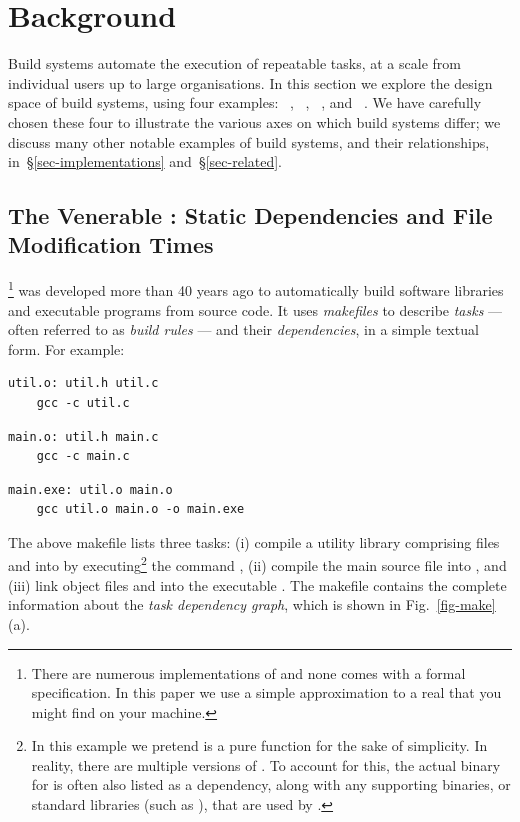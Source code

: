\section{Background}\label{sec-background}

Build systems automate the execution of repeatable tasks, at a scale from individual
users up to large organisations. In this section we explore the design space of build
systems, using four examples: \Make~\cite{feldman1979make},
\Shake~\cite{mitchell2012shake}, \mbox{\Bazel~\cite{bazel}}, and
\Excel~\cite{advanced_excel}.
We have carefully chosen these four to illustrate the various axes on which
build systems differ; we discuss many other notable examples of build systems,
and their relationships, in~\S\ref{sec-implementations} and~\S\ref{sec-related}.

\subsection{The Venerable \Make: Static Dependencies and File Modification Times}
\label{sec-background-make}

\Make\footnote{There are numerous implementations of \Make and none comes with a
formal specification. In this paper we use a simple approximation to a real
\Make that you might find on your machine.} was developed
more than 40 years ago to automatically build software libraries and executable
programs from source code. It uses \emph{makefiles} to describe \emph{tasks} --- often
referred to as \emph{build rules} --- and their \emph{dependencies}, in a simple textual
form. For example:

\vspace{1mm}
\begin{verbatim}
util.o: util.h util.c
    gcc -c util.c
\end{verbatim}
\begin{verbatim}
main.o: util.h main.c
    gcc -c main.c
\end{verbatim}
\begin{verbatim}
main.exe: util.o main.o
    gcc util.o main.o -o main.exe
\end{verbatim}
\vspace{1mm}

\noindent
The above makefile lists three tasks: (i) compile a utility library comprising
files  and  into  by
executing\footnote{In this example we pretend  is a pure function for
  the sake of simplicity. In reality, there are multiple versions of .
  To account for this, the actual binary for  is often also listed as a
  dependency, along with any supporting binaries, or standard libraries (such as
  ), that are used by .
} the command
, (ii) compile the main source file  into
, and (iii) link object files  and  into the
executable . The makefile contains the complete information about
the \emph{task dependency graph}, which is shown in Fig.~\ref{fig-make}(a).

